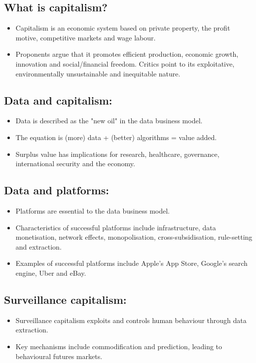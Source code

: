 \documentclass{article}
\begin{document}
\subsection*{What is capitalism?}
\begin{itemize}
    \item Capitalism is an economic system based on private property, the profit motive, competitive markets and wage labour.
    \item Proponents argue that it promotes efficient production, economic growth, innovation and social/financial freedom. Critics point to its exploitative, environmentally unsustainable and inequitable nature.
\end{itemize}

\subsection*{Data and capitalism:}
\begin{itemize}
    \item Data is described as the "new oil" in the data business model.
    \item The equation is (more) data + (better) algorithms = value added.
    \item Surplus value has implications for research, healthcare, governance, international security and the economy.
\end{itemize}

\subsection*{Data and platforms:}
\begin{itemize}
    \item Platforms are essential to the data business model.
    \item Characteristics of successful platforms include infrastructure, data monetisation, network effects, monopolisation, cross-subsidisation, rule-setting and extraction.
    \item Examples of successful platforms include Apple's App Store, Google's search engine, Uber and eBay.
\end{itemize}

\subsection*{Surveillance capitalism:}
\begin{itemize}
    \item Surveillance capitalism exploits and controls human behaviour through data extraction.
    \item Key mechanisms include commodification and prediction, leading to behavioural futures markets.
\end{itemize}
\end{document}
